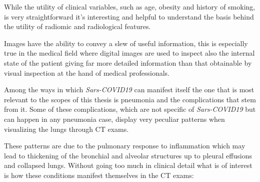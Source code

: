 While the utility of clinical variables, such as age, obesity and history of smoking, is very straightforward it's interesting and helpful to understand the basis behind the utility of radiomic and radiological features.

Images have the ability to convey a slew of useful information, this is especially true in the medical field where digital images are used to inspect also the internal state of the patient giving far more detailed information than that obtainable by visual inspection at the hand of medical professionals.

Among the ways in which \textit{Sars-COVID19} can manifest itself the one that is most relevant to the scopes of this thesis is pneumonia and the complications that stem from it.
Some of these complications, which are not specific of \textit{Sars-COVID19} but can happen in any pneumonia case, display very peculiar patterns when visualizing the lungs through CT exams.

These patterns are due to the pulmonary response to inflammation which may lead to thickening of the bronchial and alveolar structures up to pleural effusions and collapsed lungs. Without going too much in clinical detail what is of interest is how these conditions manifest themselves in the CT exams:

